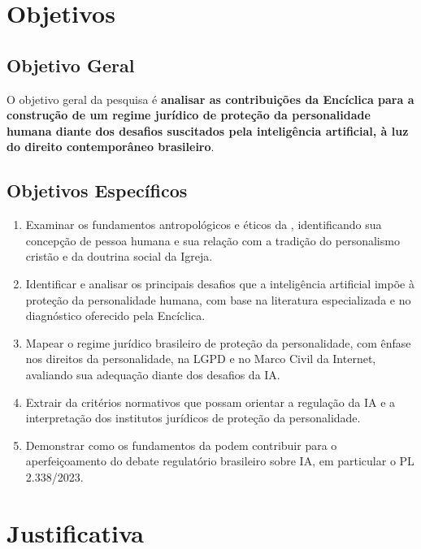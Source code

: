 \section{Objetivos}
\label{sec:objetivos}

\subsection{Objetivo Geral}
\label{subsec:objetivo-geral}

O objetivo geral da pesquisa é \textbf{analisar as contribuições da Encíclica \MH{} para a construção de um regime jurídico de proteção da personalidade humana diante dos desafios suscitados pela inteligência artificial, à luz do direito contemporâneo brasileiro}.

\subsection{Objetivos Específicos}
\label{subsec:objetivos-especificos}

\begin{enumerate}
    \item[OE1.] Examinar os fundamentos antropológicos e éticos da \MH{}, identificando sua concepção de pessoa humana e sua relação com a tradição do personalismo cristão e da doutrina social da Igreja.
    \item[OE2.] Identificar e analisar os principais desafios que a inteligência artificial impõe à proteção da personalidade humana, com base na literatura especializada e no diagnóstico oferecido pela Encíclica.
    \item[OE3.] Mapear o regime jurídico brasileiro de proteção da personalidade, com ênfase nos direitos da personalidade, na LGPD e no Marco Civil da Internet, avaliando sua adequação diante dos desafios da IA.
    \item[OE4.] Extrair da \MH{} critérios normativos que possam orientar a regulação da IA e a interpretação dos institutos jurídicos de proteção da personalidade.
    \item[OE5.] Demonstrar como os fundamentos da \MH{} podem contribuir para o aperfeiçoamento do debate regulatório brasileiro sobre IA, em particular o PL 2.338/2023.
\end{enumerate}

\section{Justificativa}
\label{sec:justificativa}

